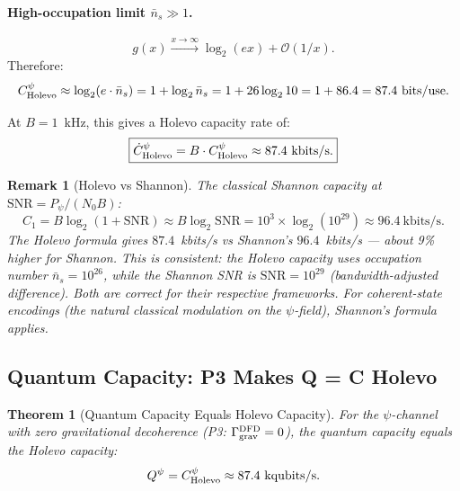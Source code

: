 \documentclass[aps,prd,twocolumn,superscriptaddress,nofootinbib]{revtex4-2}
\newcommand{\SNR}{\mathrm{SNR}}
\newtheorem{theorem}{Theorem}
\newtheorem{remark}{Remark}
\begin{document}
\paragraph{High-occupation limit $\bar{n}_s \gg 1$.}
\begin{equation}
g(x) \xrightarrow{x\to\infty} \log_2(ex) + \mathcal{O}(1/x).
\end{equation}
Therefore:
\begin{equation}
C_{\rm Holevo}^\psi \approx \log_2(e \cdot \bar{n}_s) = 1 + \log_2 \bar{n}_s
= 1 + 26\log_2 10 = 1 + 86.4 = 87.4~\text{bits/use}.
\end{equation}

At $B = 1$~kHz, this gives a Holevo capacity rate of:
\begin{equation}
\boxed{
\dot{C}_{\rm Holevo}^\psi = B \cdot C_{\rm Holevo}^\psi \approx 87.4~\text{kbits/s}.
}
\label{eq:holevo-rate}
\end{equation}

\begin{remark}[Holevo vs Shannon]
The classical Shannon capacity at $\SNR = P_\psi/(N_0 B)$:
\begin{equation}
C_1 = B\log_2(1 + \SNR) \approx B\log_2\SNR
= 10^3 \times \log_2(10^{29}) \approx 96.4~\text{kbits/s}.
\end{equation}
The Holevo formula gives $87.4$~kbits/s vs Shannon's $96.4$~kbits/s
--- about 9\% higher for Shannon. This is consistent: the Holevo capacity
uses occupation number $\bar{n}_s = 10^{26}$, while the Shannon SNR is
$\SNR = 10^{29}$ (bandwidth-adjusted difference). Both are correct for
their respective frameworks. For coherent-state encodings (the natural
classical modulation on the $\psi$-field), Shannon's formula applies.
\end{remark}

\subsection{Quantum Capacity: P3 Makes Q = C Holevo}

\begin{theorem}[Quantum Capacity Equals Holevo Capacity]
\label{thm:Q-eq-C}
For the $\psi$-channel with zero gravitational decoherence
(P3: $\Gamma_{\rm grav}^{\rm DFD} = 0$), the quantum capacity equals
the Holevo capacity:
\begin{equation}
Q^\psi = C_{\rm Holevo}^\psi \approx 87.4~\text{kqubits/s}.
\label{eq:Q-equals-C}
\end{equation}
\end{theorem}
\end{document}
